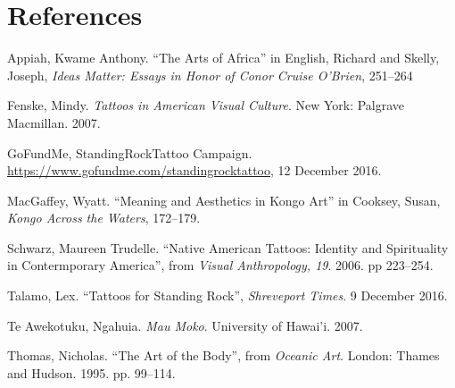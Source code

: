 \section*{References}

\bibent Appiah, Kwame Anthony. ``The Arts of Africa'' in English, Richard and
Skelly, Joseph, \textit{Ideas Matter: Essays in Honor of Conor Cruise O'Brien},
251--264

\bibent Fenske, Mindy. \textit{Tattoos in American Visual Culture}. New York:
Palgrave Macmillan. 2007.

\bibent GoFundMe, StandingRockTattoo Campaign.\\
\url{https://www.gofundme.com/standingrocktattoo}, 12 December 2016.

\bibent MacGaffey, Wyatt. ``Meaning and Aesthetics in Kongo Art'' in Cooksey,
Susan, \textit{Kongo Across the Waters}, 172--179.

\bibent Schwarz, Maureen Trudelle. ``Native American Tattoos: Identity and
Spirituality in Contermporary America'', from \textit{Visual Anthropology, 19}.
2006. pp 223--254.

\bibent Talamo, Lex. ``Tattoos for Standing Rock'', \textit{Shreveport Times}. 9
December 2016.

\bibent Te Awekotuku, Ngahuia. \textit{Mau Moko}. University of Hawai'i. 2007.

\bibent Thomas, Nicholas. ``The Art of the Body'', from \textit{Oceanic Art}.
London: Thames and Hudson. 1995. pp.  99--114.
